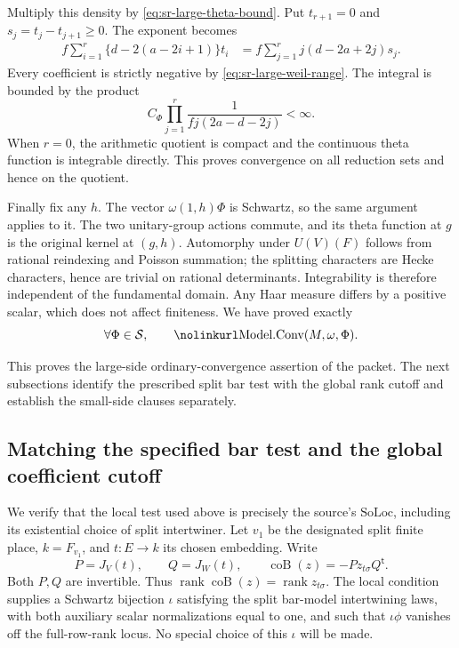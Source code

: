Multiply this density by
\eqref{eq:sr-large-theta-bound}.
Put \(t_{r+1}=0\) and \(s_j=t_j-t_{j+1}\ge0\).
The exponent becomes
\[
 \begin{split}
 f\sum_{i=1}^r\{d-2(a-2i+1)\}t_i
        &=f\sum_{j=1}^r
             j(d-2a+2j)s_j .
 \end{split}
\]
Every coefficient is strictly negative by
\eqref{eq:sr-large-weil-range}.
The integral is bounded by the product
\[
                 C_\Phi\prod_{j=1}^r
                    \frac1{fj(2a-d-2j)}<\infty .
\]
When \(r=0\), the arithmetic quotient is compact and
the continuous theta function is integrable directly.
This proves convergence on all reduction sets and hence
on the quotient.

Finally fix any \(h\).
The vector \(\omega(1,h)\Phi\) is Schwartz, so the same
argument applies to it.
The two unitary-group actions commute, and its theta
function at \(g\) is the original kernel at \((g,h)\).
Automorphy under \(U(V)(F)\) follows from rational
reindexing and Poisson summation; the splitting
characters are Hecke characters, hence are trivial on
rational determinants.
Integrability is therefore independent of the
fundamental domain.
Any Haar measure differs by a positive scalar, which
does not affect finiteness.
We have proved exactly
\[
          \forall\Phi\in\mathcal S,\qquad
               \srcid{Model.Conv}(M,\omega,\Phi).
\]

This proves the large-side ordinary-convergence
assertion of the packet. The next subsections identify
the prescribed split bar test with the global rank cutoff
and establish the small-side clauses separately.



\subsection{Matching the specified bar test and the global coefficient cutoff}
\label{subsec:sr-exact-bar-cutoff}

We verify that the local test used above is precisely the
source's \(\mathrm{SoLoc}\), including its existential
choice of split intertwiner. Let \(v_1\) be the designated
split finite place, \(k=F_{v_1}\), and \(t:E\to k\) its
chosen embedding. Write
\[
 P=J_V(t),\qquad Q=J_W(t),\qquad
             \operatorname{coB}(z)=-Pz_{t\sigma}Q^{\mathsf t}.
\]
Both \(P,Q\) are invertible. Thus
\(\operatorname{rank}\operatorname{coB}(z)
 =\operatorname{rank}z_{t\sigma}\).
The local condition supplies a Schwartz bijection
\(\iota\) satisfying the split bar-model intertwining
laws, with both auxiliary scalar normalizations equal
to one, and such that \(\iota\phi\) vanishes off the
full-row-rank locus. No special choice of this
\(\iota\) will be made.

